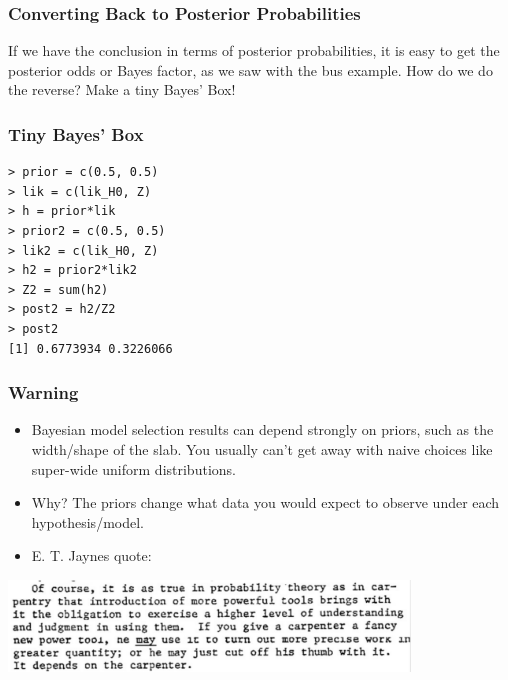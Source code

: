 \documentclass{beamer}
\begin{document}
\begin{frame}[fragile]
\frametitle{Converting Back to Posterior Probabilities}
If we have the conclusion in terms of posterior probabilities, it is easy
to get the posterior odds or Bayes factor, as we saw with the bus example.
How do we do the reverse? Make a tiny Bayes' Box!

\end{frame}

\begin{frame}[fragile]
\frametitle{Tiny Bayes' Box}

\begin{verbatim}
> prior = c(0.5, 0.5)
> lik = c(lik_H0, Z)
> h = prior*lik
> prior2 = c(0.5, 0.5)
> lik2 = c(lik_H0, Z)
> h2 = prior2*lik2
> Z2 = sum(h2)
> post2 = h2/Z2
> post2
[1] 0.6773934 0.3226066
\end{verbatim}


\end{frame}

\begin{frame}
\frametitle{Warning}

\begin{itemize}
\item Bayesian model selection results
can depend strongly on priors, such as the width/shape of the slab. You usually
can't get away with naive choices like super-wide uniform distributions.\pause
\item Why? The priors change what data you would expect to observe under each
hypothesis/model.\pause
\item E. T. Jaynes quote:
\end{itemize}

\includegraphics[width=0.8\textwidth]{images/carpenter.png}

\end{frame}
\end{document}
